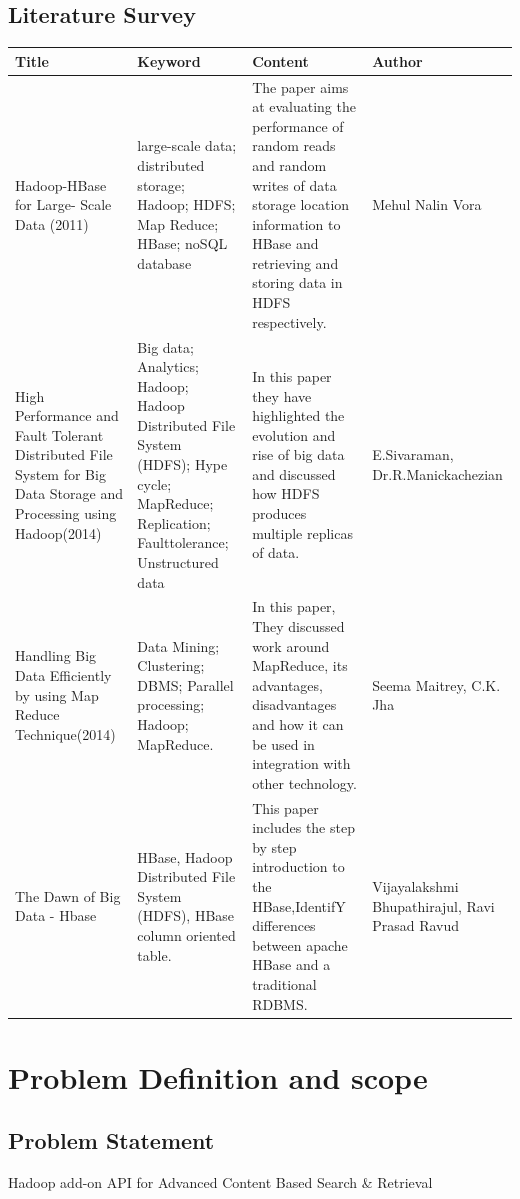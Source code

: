 \documentclass[oneside,a4paper,12pt]{report}
\begin{document}
\section{Literature Survey}
{\tabulinesep=2mm
   \begin{longtabu} { |p{3.5cm} | p{3.5cm} | p{3.5cm }| p{3.5cm }|}
       \hline

\textbf{Title} & \textbf{Keyword} & \textbf{Content} & \textbf{Author}\\ \hline
Hadoop-HBase for Large- Scale  Data (2011) &
large-scale  data;  distributed  storage;  Hadoop; HDFS; Map Reduce; HBase; noSQL database &
The  paper  aims  at evaluating the performance of random reads and random writes of data storage location information to HBase and retrieving and storing  data  in  HDFS  respectively. &
Mehul Nalin Vora \\ \hline

High Performance and Fault Tolerant Distributed File System for Big Data Storage and Processing using Hadoop(2014) &
Big data; Analytics; Hadoop; Hadoop Distributed File System (HDFS); Hype cycle; MapReduce; Replication; Faulttolerance; Unstructured data &
In this paper they have highlighted the evolution and rise of big data  and discussed how HDFS produces multiple replicas of data. &
E.Sivaraman, Dr.R.Manickachezian \\ \hline

Handling Big Data Efficiently by using Map Reduce Technique(2014) &
Data Mining; Clustering; DBMS; Parallel processing; Hadoop; MapReduce. &
 In this paper, They discussed work around MapReduce, its advantages, disadvantages and how it can be used in integration with other technology. &
Seema Maitrey, C.K. Jha \\ \hline

The Dawn of Big Data - Hbase &
HBase, Hadoop Distributed File System (HDFS), HBase column oriented table. &
This paper includes the step by step introduction to the HBase,IdentifY differences between apache HBase and a traditional RDBMS. &
Vijayalakshmi Bhupathirajul, Ravi Prasad Ravud \\ \hline
      
   \end{longtabu}
}


\chapter{Problem Definition and scope}
\section{Problem Statement}
Hadoop add-on API for Advanced Content Based Search \& Retrieval
\end{document}
